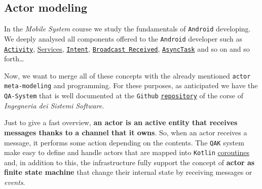 \subsection{Actor modeling}

In the \textit{Mobile System} course we study the fundamentals of \texttt{Android} developing.
We deeply analysed all components offered to the \texttt{Android} developer such as \href{https://developer.android.com/reference/android/app/Activity}{\texttt{Activity}}, \href{https://developer.android.com/guide/components/services}{Services}, \href{https://developer.android.com/reference/android/content/Intent}{\texttt{Intent}},
\href{https://developer.android.com/guide/components/broadcasts}{\texttt{Broadcast Received}}, \href{https://developer.android.com/reference/android/os/AsyncTask}{\texttt{AsyncTask}} and so on and so forth\dots

Now, we want to merge all of these concepts with the already mentioned \texttt{actor meta-modeling} and programming. For these purposes, as anticipated we have the \texttt{QA-System} that is well documented at the \texttt{Github} \href{https://htmlpreview.github.io/?https://github.com/anatali/issLab2022/blob/main/it.unibo.issLabStart/userDocs/Dispense/lezioni/html/QakIntro.html}{\texttt{repository}} of the corse of \textit{Ingegneria dei Sistemi Software}.

Just to give a fast overview, \textbf{an actor is an active entity that receives messages thanks to a channel that it owns}. So, when an actor receives a message, it performs some action depending on the contents. The \texttt{QAK} system make easy to define and handle actors that are mapped into \texttt{Kotlin} \href{https://developer.android.com/kotlin/coroutines?gclsrc=ds&gclsrc=ds}{coroutines} and, in addition to this, the infrastructure fully support the concept of \textbf{actor as finite state machine} that change their internal state by receiving messages or \textit{events}.

 

